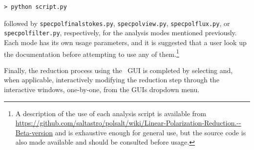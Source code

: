 \begin{verbatim}> python script.py\end{verbatim}

\noindent followed by \texttt{specpolfinalstokes.py}, \texttt{specpolview.py}, \texttt{specpolflux.py}, or \texttt{specpol\-filter.py}, respectively, for the analysis modes mentioned previously. Each mode has its own usage parameters, and it is suggested that a user look up the documentation before attempting to use any of them.\footnote{A description of the use of each analysis script is available from \url{https://github.com/saltastro/polsalt/wiki/Linear-Polarization-Reduction.--Beta-version} and is exhaustive enough for general use, but the source code is also made available and should be consulted before usage.}
\prgph

Finally, the reduction process using the \polsalt\ \gls{GUI} is completed by selecting and, when applicable, interactively modifying the reduction step through the interactive windows, one-by-one, from the \glspl{GUI} dropdown menu.
\prgph

